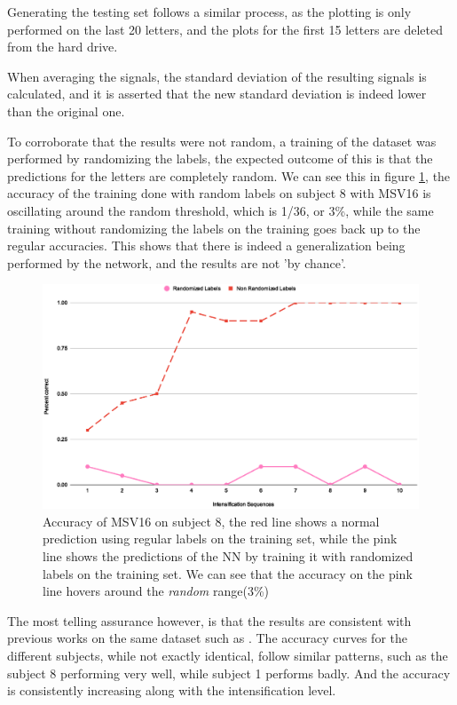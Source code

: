 \documentclass[conference]{IEEEtran}
\begin{document}
Generating the testing set follows a similar process, as the plotting is only performed on the last 20 letters, and the plots for the first 15 letters are deleted from the hard drive.

When averaging the signals, the standard deviation of the resulting signals is calculated, and it is asserted that the new standard deviation is indeed lower than the original one.

To corroborate that the results were not random, a training of the dataset was performed by randomizing the labels, the expected outcome of this is that the predictions for the letters are completely random. We can see this in figure \ref{image:randomlabels}, the accuracy of the training done with random labels on subject 8 with MSV16 is oscillating around the random threshold, which is 1/36, or 3\%, while the same training without randomizing the labels on the training goes back up to the regular accuracies. This shows that there is indeed a generalization being performed by the network, and the results are not 'by chance'.

\begin{figure}[htb]
  \centering
  \includegraphics[width=\linewidth]{images/randomlabels.eps}
  \caption[Random Labels Accuracy]{Accuracy of MSV16 on subject 8, the red line shows a normal prediction using regular labels on the training set, while the pink line shows the predictions of the NN by training it with randomized labels on the training set. We can see that the accuracy on the pink line hovers around the \emph{random} range(3\%)}
  \label{image:randomlabels}
\end{figure}

The most telling assurance however, is that the results are consistent with previous works on the same dataset such as \cite{ramele2019histogram}. The accuracy curves for the different subjects, while not exactly identical, follow similar patterns, such as the subject 8 performing very well, while subject 1 performs badly. And the accuracy is consistently increasing along with the intensification level.
\end{document}
